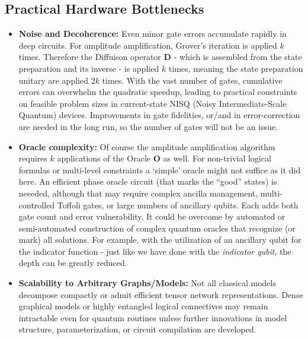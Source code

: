 \documentclass[encoding=utf8,british]{tumphthesis}
\begin{document}
        \subsection*{Practical Hardware Bottlenecks}
        \begin{itemize}
            \item \textbf{Noise and Decoherence:} Even minor gate errors accumulate rapidly in deep circuits. For amplitude amplification, Grover’s iteration is applied $k$ times. Therefore the Diffuison operator \textbf{D} - which is assembled from
            the state preparation and its inverse - is applied $k$ times, meaning the state preparation unitary are applied $2k$ times.      
            With the vast number of gates, cumulative errors can overwhelm the quadratic speedup, leading to practical constraints on feasible problem sizes in current-state NISQ (Noisy Intermediate-Scale Quantum) devices. 
            Improvements in gate fidelities, or/and in error-correction are needed in the long run, so the number of gates will not be an issue.
            \item \textbf{Oracle complexity:} Of course the amplitude amplification algorithm requires $k$ applications of the Oracle \textbf{O} as well. For non-trivial logical formulas or multi-level constraints a `simple' 
            oracle might not suffice as it did here. An efficient phase oracle circuit (that marks the “good” states) is neeeded, although that may require complex ancilla management, multi-controlled Toffoli gates, or large 
            numbers of ancillary qubits. Each adds both gate count and error vulnerability. It could be overcome by automated or semi-automated construction of complex quantum oracles that recognize (or mark) all solutions.
            For example, with the utilization of an ancillary qubit for the indicator function - just like we have done with the \textit{indicator qubit}, the depth can be greatly reduced.
            \item \textbf{Scalability to Arbitrary Graphs/Models:} Not all classical models decompose compactly or admit efficient tensor network representations. Dense graphical models or highly entangled 
            logical connectives may remain intractable even for quantum routines unless further innovations in model structure, parameterization, or circuit compilation are developed.
        \end{itemize}
\end{document}
